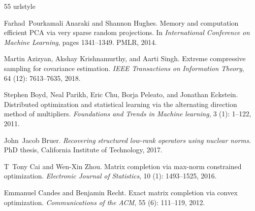 \documentclass[11pt]{article}
\begin{document}

%
%
%
%

\begin{thebibliography}{55}
\providecommand{\natexlab}[1]{#1}
\providecommand{\url}[1]{\texttt{#1}}
\expandafter\ifx\csname urlstyle\endcsname\relax
  \providecommand{\doi}[1]{doi: #1}\else
  \providecommand{\doi}{doi: \begingroup \urlstyle{rm}\Url}\fi

Farhad~Pourkamali Anaraki and Shannon Hughes.
\newblock Memory and computation efficient {PCA} via very sparse random
  projections.
\newblock In \emph{International Conference on Machine Learning}, pages
  1341--1349. PMLR, 2014.

Martin Azizyan, Akshay Krishnamurthy, and Aarti Singh.
\newblock Extreme compressive sampling for covariance estimation.
\newblock \emph{IEEE Transactions on Information Theory}, 64
  (12): 7613--7635, 2018.

Stephen Boyd, Neal Parikh, Eric Chu, Borja Peleato, and Jonathan Eckstein.
\newblock Distributed optimization and statistical learning via the alternating
  direction method of multipliers.
\newblock \emph{Foundations and Trends{\textregistered} in Machine learning},
  3 (1): 1--122, 2011.

John~Jacob Bruer.
\newblock \emph{Recovering structured low-rank operators using nuclear norms}.
\newblock PhD thesis, California Institute of Technology, 2017.

T~Tony Cai and Wen-Xin Zhou.
\newblock Matrix completion via max-norm constrained optimization.
\newblock \emph{Electronic Journal of Statistics}, 10 (1):
  1493--1525, 2016.

Emmanuel Candes and Benjamin Recht.
\newblock Exact matrix completion via convex optimization.
\newblock \emph{Communications of the ACM}, 55 (6): 111--119,
  2012.


\end{thebibliography}
\end{document}
